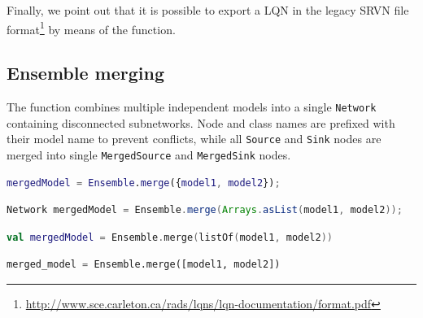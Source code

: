 Finally, we point out that it is possible to export a LQN in the legacy SRVN file format\footnote{\url{http://www.sce.carleton.ca/rads/lqns/lqn-documentation/format.pdf}} by means of the  function.

\subsection{Ensemble merging}
\label{ensemble-merging}
The  function combines multiple independent models into a single \texttt{Network} containing disconnected subnetworks. Node and class names are prefixed with their model name to prevent conflicts, while all \texttt{Source} and \texttt{Sink} nodes are merged into single \texttt{MergedSource} and \texttt{MergedSink} nodes.
\begin{MATLAB}
\begin{lstlisting}[language = matlab]
mergedModel = Ensemble.merge({model1, model2});
\end{lstlisting}
\end{MATLAB}
\begin{JAVA}
\begin{lstlisting}[language=java, basicstyle=\ttfamily\scriptsize]
Network mergedModel = Ensemble.merge(Arrays.asList(model1, model2));
\end{lstlisting}
\end{JAVA}
\begin{KOTLIN}
\begin{lstlisting}[language=kotlin, basicstyle=\ttfamily\scriptsize]
val mergedModel = Ensemble.merge(listOf(model1, model2))
\end{lstlisting}
\end{KOTLIN}
\begin{PYTHON}
\begin{lstlisting}[language=python]
merged_model = Ensemble.merge([model1, model2])
\end{lstlisting}
\end{PYTHON}

